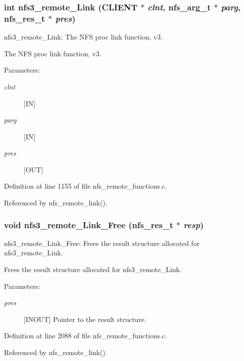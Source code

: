 \subsubsection{\setlength{\rightskip}{0pt plus 5cm}int nfs3\_\-remote\_\-Link (CLIENT $\ast$ {\em clnt}, nfs\_\-arg\_\-t $\ast$ {\em parg}, nfs\_\-res\_\-t $\ast$ {\em pres})}\label{group__NFSprocs_ga28}


nfs3\_\-remote\_\-Link: The NFS proc link function, v3.

The NFS proc link function, v3.

\begin{Desc}
\item[Parameters:]
\begin{description}
\item[{\em clnt}][IN] \item[{\em parg}][IN] \item[{\em pres}][OUT] \end{description}
\end{Desc}


Definition at line 1155 of file nfs\_\-remote\_\-functions.c.

Referenced by nfs\_\-remote\_\-link().
\subsubsection{\setlength{\rightskip}{0pt plus 5cm}void nfs3\_\-remote\_\-Link\_\-Free (nfs\_\-res\_\-t $\ast$ {\em resp})}\label{group__NFSprocs_ga86}


nfs3\_\-remote\_\-Link\_\-Free: Frees the result structure allocated for nfs3\_\-remote\_\-Link.

Frees the result structure allocated for nfs3\_\-remote\_\-Link.

\begin{Desc}
\item[Parameters:]
\begin{description}
\item[{\em pres}][INOUT] Pointer to the result structure. \end{description}
\end{Desc}


Definition at line 2088 of file nfs\_\-remote\_\-functions.c.

Referenced by nfs\_\-remote\_\-link().

